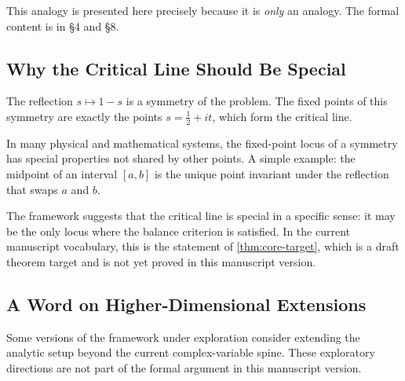 This analogy is presented here precisely because it is \emph{only} an analogy.
The formal content is in \S4 and \S8.

\subsection{Why the Critical Line Should Be Special}

The reflection $s \mapsto 1-s$ is a symmetry of the problem. The fixed points
of this symmetry are exactly the points $s = \tfrac{1}{2} + it$, which form the
critical line.

In many physical and mathematical systems, the fixed-point locus of a symmetry
has special properties not shared by other points. A simple example: the midpoint
of an interval $[a, b]$ is the unique point invariant under the reflection that
swaps $a$ and $b$.

The framework suggests that the critical line is special in a specific sense:
it may be the only locus where the balance criterion is satisfied. In the current
manuscript vocabulary, this is the statement of
\cref{thm:core-target}, which is a draft theorem target and
is not yet proved in this manuscript version.

\subsection{A Word on Higher-Dimensional Extensions}

Some versions of the framework under exploration consider extending the analytic
setup beyond the current complex-variable spine. These exploratory directions are
not part of the formal argument in this manuscript version.
